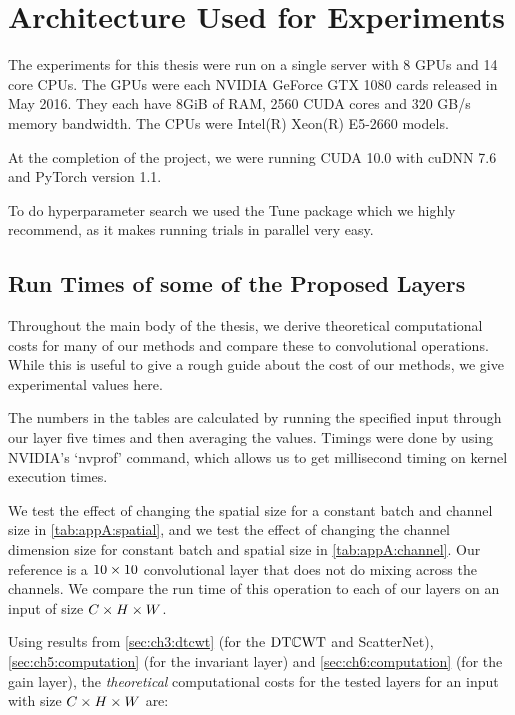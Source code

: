 \chapter{Architecture Used for Experiments} \label{app:arch}
\def \path {dtcwt_scat}
\def \imgpath {\path/images}

The experiments for this thesis were run on a single server with 8 GPUs and 14
core CPUs. The GPUs were each NVIDIA GeForce GTX 1080 cards released in May 2016.
They each have 8GiB of RAM, 2560 CUDA cores and 320 GB/s memory bandwidth.
The CPUs were Intel(R) Xeon(R) E5-2660 models. 

At the completion of the project, we were running CUDA 10.0 with cuDNN 7.6 and 
PyTorch version 1.1.

To do hyperparameter search we used the Tune package \cite{liaw2018tune} which
we highly recommend, as it makes running trials in parallel very easy.

\section{Run Times of some of the Proposed Layers}
Throughout the main body of the thesis, we derive theoretical computational
costs for many of our methods and compare these to convolutional operations.
While this is useful to give a rough guide about the cost of our methods, we
give experimental values here. 

The numbers in the tables are calculated by running the specified input through our
layer five times and then averaging the values. Timings were done by using
NVIDIA's `nvprof' command, which allows us to get millisecond timing on kernel
execution times.

We test the effect of changing the spatial size for a constant batch and channel
size in \autoref{tab:appA:spatial}, and we test the effect of changing the
channel dimension size for constant batch and spatial size in
\autoref{tab:appA:channel}. Our reference is a $10\times 10$ convolutional layer
that does not do mixing across the channels. We compare the run time of this operation
to each of our layers on an input of size $C\times H\times W$.

Using results from \autoref{sec:ch3:dtcwt} (for the $\mathrm{DT}\mathbb{C}\mathrm{WT}$ and ScatterNet),
\autoref{sec:ch5:computation} (for the invariant layer) and
\autoref{sec:ch6:computation} (for the gain layer), the \emph{theoretical}
computational costs for the tested layers for an input with size $C\times H\times W$
are:

